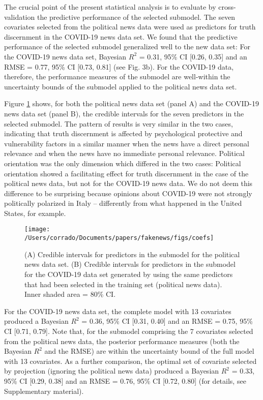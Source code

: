 \documentclass[
  english,
  man,floatsintext]{apa6}
\begin{document}
The crucial point of the present statistical analysis is to evaluate by cross-validation the predictive performance of the selected submodel. The seven covariates selected from the political news data were used as predictors for truth discernment in the COVID-19 news data set. We found that the predictive performance of the selected submodel generalized well to the new data set: For the COVID-19 news data set, Bayesian \(R^2\) = 0.31, 95\% CI {[}0.26, 0.35{]} and an RMSE = 0.77, 95\% CI {[}0.73, 0.81{]} (see Fig. 3b). For the COVID-19 data, therefore, the performance measures of the submodel are well-within the uncertainty bounds of the submodel applied to the political news data set.

Figure \ref{fig:coefsprojmodels} shows, for both the political news data set (panel A) and the COVID-19 news data set (panel B), the credible intervals for the seven predictors in the selected submodel. The pattern of results is very similar in the two cases, indicating that truth discernment is affected by psychological protective and vulnerability factors in a similar manner when the news have a direct personal relevance and when the news have no immediate personal relevance. Political orientation was the only dimension which differed in the two cases: Political orientation showed a facilitating effect for truth discernment in the case of the political news data, but not for the COVID-19 news data. We do not deem this difference to be surprising because opinions about COVID-19 were not strongly politically polarized in Italy -- differently from what happened in the United States, for example.



\begin{figure}

{\centering \texttt{[image: /Users/corrado/Documents/papers/fakenews/figs/coefs]} 

}

\caption{(A) Credible intervals for predictors in the submodel for the political news data set. (B) Credible intervals for predictors in the submodel for the COVID-19 data set generated by using the same predictors that had been selected in the training set (political news data). Inner shaded area = 80\% CI.}\label{fig:coefsprojmodels}
\end{figure}

For the COVID-19 news data set, the complete model with 13 covariates produced a Bayesian \(R^2\) = 0.36, 95\% CI {[}0.31, 0.40{]} and an RMSE = 0.75, 95\% CI {[}0.71, 0.79{]}. Note that, for the submodel comprising the 7 covariates selected from the political news data, the posterior performance measures (both the Bayesian \(R^2\) and the RMSE) are within the uncertainty bound of the full model with 13 covariates. As a further comparison, the optimal set of covariate selected by projection (ignoring the political news data) produced a Bayesian \(R^2\) = 0.33, 95\% CI {[}0.29, 0.38{]} and an RMSE = 0.76, 95\% CI {[}0.72, 0.80{]} (for details, see Supplementary material).
\end{document}
